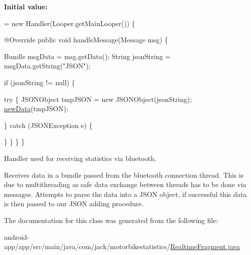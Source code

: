 {\bfseries Initial value\+:}
\begin{DoxyCode}
= \textcolor{keyword}{new} Handler(Looper.getMainLooper()) \{

        
        @Override
        \textcolor{keyword}{public} \textcolor{keywordtype}{void} handleMessage(Message msg) \{

            Bundle msgData = msg.getData();
            String jsonString = msgData.getString(\textcolor{stringliteral}{"JSON"});

            \textcolor{keywordflow}{if} (jsonString != null) \{

                
                \textcolor{keywordflow}{try} \{
                    JSONObject tmpJSON = \textcolor{keyword}{new} JSONObject(jsonString);
                    \hyperlink{classcom_1_1jack_1_1motorbikestatistics_1_1_realtime_fragment_a675832561a8d63214b8f2cd59e901de5}{newData}(tmpJSON);

                \} \textcolor{keywordflow}{catch} (JSONException e) \{
                    
                \}
            \}
        \}
    \}
\end{DoxyCode}


Handler used for receiving statistics via bluetooth. 

Receives data in a bundle passed from the bluetooth connection thread. This is due to multithreading as safe data exchange between threads has to be done via messages. Attempts to parse the data into a J\+S\+ON object, if successful this data is then passed to our J\+S\+ON adding procedure. 

The documentation for this class was generated from the following file\+:\begin{DoxyCompactItemize}
\item 
android-\/app/app/src/main/java/com/jack/motorbikestatistics/\hyperlink{_realtime_fragment_8java}{Realtime\+Fragment.\+java}\end{DoxyCompactItemize}
